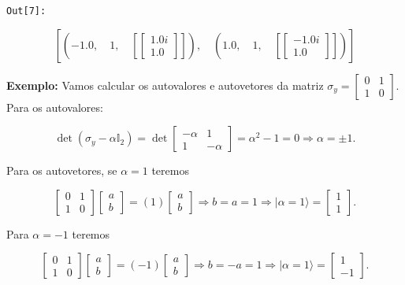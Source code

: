 \documentclass[11pt]{article}
\begin{document}
\texttt{\color{outcolor}Out[{\color{outcolor}7}]:}
    
    $$\left [ \left ( -1.0, \quad 1, \quad \left [ \left[\begin{matrix}1.0 i\\1.0\end{matrix}\right]\right ]\right ), \quad \left ( 1.0, \quad 1, \quad \left [ \left[\begin{matrix}- 1.0 i\\1.0\end{matrix}\right]\right ]\right )\right ]$$

    

    \textbf{Exemplo:} Vamos calcular os autovalores e autovetores da matriz
\(\sigma_{y}=\begin{bmatrix}0&1\\1&0\end{bmatrix}\). Para os
autovalores:

\begin{equation}
\det(\sigma_{y}-\alpha\mathbb{I}_{2}) = \det\begin{bmatrix}-\alpha&1\\1&-\alpha\end{bmatrix}=\alpha^{2}-1=0\Rightarrow \alpha=\pm 1.
\end{equation}

Para os autovetores, se \(\alpha=1\) teremos

\begin{equation}
\begin{bmatrix}0&1\\1&0\end{bmatrix}\begin{bmatrix}a\\b\end{bmatrix}=(1)\begin{bmatrix}a\\b\end{bmatrix}\Rightarrow b=a=1\Rightarrow |\alpha=1\rangle = \begin{bmatrix}1\\1\end{bmatrix}.
\end{equation}

Para \(\alpha=-1\) teremos

\begin{equation}
\begin{bmatrix}0&1\\1&0\end{bmatrix}\begin{bmatrix}a\\b\end{bmatrix}=(-1)\begin{bmatrix}a\\b\end{bmatrix}\Rightarrow b=-a=1\Rightarrow |\alpha=1\rangle = \begin{bmatrix}1\\-1\end{bmatrix}.
\end{equation}
\end{document}
